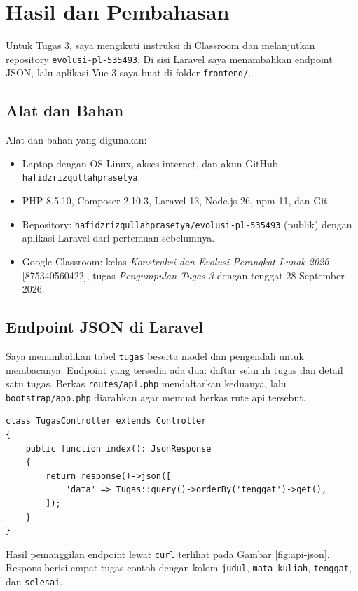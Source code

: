 \documentclass[a4paper,oneside,12pt]{report}
\newcommand{\tocboldsection}[1]{%
  \protect\renewcommand{\protect\cftchapfont}{\protect\bfseries}%
  #1%
  \protect\renewcommand{\protect\cftchapfont}{}%
}
\begin{document}
\clearpage

\chapter[\tocboldsection{Hasil dan Pembahasan}]{Hasil dan Pembahasan}
Untuk Tugas 3, saya mengikuti instruksi di Classroom dan melanjutkan repository \texttt{evolusi-pl-535493}. Di sisi Laravel saya menambahkan endpoint JSON, lalu aplikasi Vue 3 saya buat di folder \texttt{frontend/}.

\section{Alat dan Bahan}
Alat dan bahan yang digunakan:
\begin{itemize}
    \item Laptop dengan OS Linux, akses internet, dan akun GitHub \texttt{hafidzrizqullahprasetya}.
    \item PHP 8.5.10, Composer 2.10.3, Laravel 13, Node.js 26, npm 11, dan Git.
    \item Repository: \texttt{hafidzrizqullahprasetya/evolusi-pl-535493} (publik) dengan aplikasi Laravel dari pertemuan sebelumnya.
    \item Google Classroom: kelas \textit{Konstruksi dan Evolusi Perangkat Lunak 2026} [875340560422], tugas \textit{Pengumpulan Tugas 3} dengan tenggat 28 September 2026.
\end{itemize}

\section{Endpoint JSON di Laravel}
Saya menambahkan tabel \texttt{tugas} beserta model dan pengendali untuk membacanya. Endpoint yang tersedia ada dua: daftar seluruh tugas dan detail satu tugas. Berkas \texttt{routes/api.php} mendaftarkan keduanya, lalu \texttt{bootstrap/app.php} diarahkan agar memuat berkas rute api tersebut.

\begin{lstlisting}[style=phpstyle,caption={Pengendali daftar tugas.}]
class TugasController extends Controller
{
    public function index(): JsonResponse
    {
        return response()->json([
            'data' => Tugas::query()->orderBy('tenggat')->get(),
        ]);
    }
}
\end{lstlisting}

Hasil pemanggilan endpoint lewat \texttt{curl} terlihat pada Gambar \ref{fig:api-json}. Respons berisi empat tugas contoh dengan kolom \texttt{judul}, \texttt{mata\_kuliah}, \texttt{tenggat}, dan \texttt{selesai}.
\end{document}
